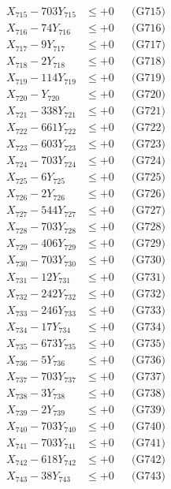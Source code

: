 \documentclass[a4paper,10pt]{article}
\begin{document}
{\begin{align}
X_{715} - 703Y_{715} &\leq +0 && \text{(G715)} \\
X_{716} - 74Y_{716} &\leq +0 && \text{(G716)} \\
X_{717} - 9Y_{717} &\leq +0 && \text{(G717)} \\
X_{718} - 2Y_{718} &\leq +0 && \text{(G718)} \\
X_{719} - 114Y_{719} &\leq +0 && \text{(G719)} \\
X_{720} - Y_{720} &\leq +0 && \text{(G720)} \\
\allowbreak
X_{721} - 338Y_{721} &\leq +0 && \text{(G721)} \\
X_{722} - 661Y_{722} &\leq +0 && \text{(G722)} \\
X_{723} - 603Y_{723} &\leq +0 && \text{(G723)} \\
X_{724} - 703Y_{724} &\leq +0 && \text{(G724)} \\
X_{725} - 6Y_{725} &\leq +0 && \text{(G725)} \\
X_{726} - 2Y_{726} &\leq +0 && \text{(G726)} \\
X_{727} - 544Y_{727} &\leq +0 && \text{(G727)} \\
X_{728} - 703Y_{728} &\leq +0 && \text{(G728)} \\
X_{729} - 406Y_{729} &\leq +0 && \text{(G729)} \\
X_{730} - 703Y_{730} &\leq +0 && \text{(G730)} \\
\allowbreak
X_{731} - 12Y_{731} &\leq +0 && \text{(G731)} \\
X_{732} - 242Y_{732} &\leq +0 && \text{(G732)} \\
X_{733} - 246Y_{733} &\leq +0 && \text{(G733)} \\
X_{734} - 17Y_{734} &\leq +0 && \text{(G734)} \\
X_{735} - 673Y_{735} &\leq +0 && \text{(G735)} \\
X_{736} - 5Y_{736} &\leq +0 && \text{(G736)} \\
X_{737} - 703Y_{737} &\leq +0 && \text{(G737)} \\
X_{738} - 3Y_{738} &\leq +0 && \text{(G738)} \\
X_{739} - 2Y_{739} &\leq +0 && \text{(G739)} \\
X_{740} - 703Y_{740} &\leq +0 && \text{(G740)} \\
\allowbreak
X_{741} - 703Y_{741} &\leq +0 && \text{(G741)} \\
X_{742} - 618Y_{742} &\leq +0 && \text{(G742)} \\
X_{743} - 38Y_{743} &\leq +0 && \text{(G743)} \\

\end{align}}
\end{document}
